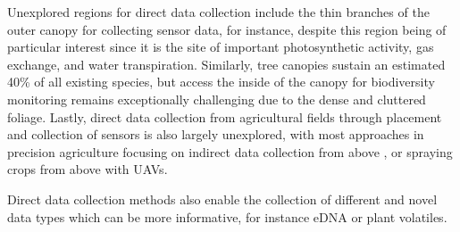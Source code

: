 Unexplored regions for direct data collection include the thin branches of the outer canopy for collecting sensor data, for instance, despite this region being of particular interest since it is the site of important photosynthetic activity, gas exchange, and water transpiration. 
Similarly, tree canopies sustain an estimated 40\% of all existing species, but access the inside of the canopy for biodiversity monitoring remains exceptionally challenging due to the dense and cluttered foliage. %
Lastly, direct data collection from agricultural fields through placement and collection of sensors is also largely unexplored, with most approaches in precision agriculture focusing on indirect data collection from above \cite{}, or spraying crops from above with UAVs\cite{}.

Direct data collection methods also enable the collection of different and novel data types which can be more informative, for instance eDNA or plant volatiles.



